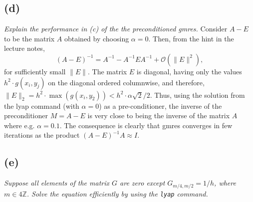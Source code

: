 \subsection*{(d)}
\emph{Explain the performance in (c) of the the preconditioned gmres.
}
Consider $A-E$ to be the matrix $A$ obtained by choosing $\alpha = 0$. Then, from the hint in the lecture notes,
\begin{equation}
(A-E)^{-1} = A^{-1}-A^{-1}EA^{-1}+\mathcal O(\|E\|^2),
\end{equation}
for sufficiently small $\|E\|$. The matrix $E$ is diagonal, having only the values $h^2\cdot g(x_i,y_j)$ on the diagonal ordered columnwise, and therefore, $\|E\|_2 = h^2\cdot \max(g(x_i,y_2))<h^2\cdot\alpha \sqrt{2}/2$. Thus, using the solution from the lyap command (with $\alpha = 0$) as a pre-conditioner, the inverse of the preconditioner $M=A-E$ is very close to being the inverse of the matrix $A$ where e.g. $\alpha = 0.1$. The consequence is clearly that gmres converges in few iterations as the product $(A-E)^{-1}A\approx I$.

\subsection*{(e)}
\emph{Suppose all elements of the matrix $G$ are zero except $G_{m/4,m/2} = 1/h$, where $m\in 4\mathbb Z$. Solve the equation efficiently by using the \texttt{lyap} command.}

